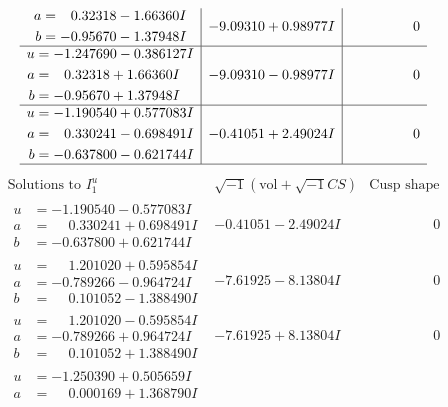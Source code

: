 \documentclass[1p]{elsarticle_modified}
\theoremstyle{definition}
\newcommand{\I}{\sqrt{-1}}
\begin{document}
$$\begin{array}{c|c|c}
\begin{aligned}
a &= \phantom{-}0.32318 - 1.66360 I \\
b &= -0.95670 - 1.37948 I\end{aligned}
 & -9.09310 + 0.98977 I & \phantom{-0.000000 } 0 \\ \hline\begin{aligned}
u &= -1.247690 - 0.386127 I \\
a &= \phantom{-}0.32318 + 1.66360 I \\
b &= -0.95670 + 1.37948 I\end{aligned}
 & -9.09310 - 0.98977 I & \phantom{-0.000000 } 0 \\ \hline\begin{aligned}
u &= -1.190540 + 0.577083 I \\
a &= \phantom{-}0.330241 - 0.698491 I \\
b &= -0.637800 - 0.621744 I\end{aligned}
 & -0.41051 + 2.49024 I & \phantom{-0.000000 } 0\\
 \hline 
 \end{array}$$\newpage$$\begin{array}{c|c|c}  
\text{Solutions to }I^u_{1}& \I (\text{vol} + \sqrt{-1}CS) & \text{Cusp shape}\\
 \hline 
\begin{aligned}
u &= -1.190540 - 0.577083 I \\
a &= \phantom{-}0.330241 + 0.698491 I \\
b &= -0.637800 + 0.621744 I\end{aligned}
 & -0.41051 - 2.49024 I & \phantom{-0.000000 } 0 \\ \hline\begin{aligned}
u &= \phantom{-}1.201020 + 0.595854 I \\
a &= -0.789266 - 0.964724 I \\
b &= \phantom{-}0.101052 - 1.388490 I\end{aligned}
 & -7.61925 - 8.13804 I & \phantom{-0.000000 } 0 \\ \hline\begin{aligned}
u &= \phantom{-}1.201020 - 0.595854 I \\
a &= -0.789266 + 0.964724 I \\
b &= \phantom{-}0.101052 + 1.388490 I\end{aligned}
 & -7.61925 + 8.13804 I & \phantom{-0.000000 } 0 \\ \hline\begin{aligned}
u &= -1.250390 + 0.505659 I \\
a &= \phantom{-}0.000169 + 1.368790 I \\

\end{aligned}
\end{array}$$
\end{document}
